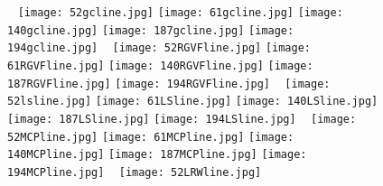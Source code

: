 \documentclass[nomlist,masters]{seuthesix}
\begin{document}
\begin{figure}[H]
\centering 
\texttt{[image: 52gcline.jpg]}
\hspace{0.001\textwidth}
\texttt{[image: 61gcline.jpg]}
\hspace{0.001\textwidth}
\texttt{[image: 140gcline.jpg]}
\hspace{0.001\textwidth}
\texttt{[image: 187gcline.jpg]}
\hspace{0.001\textwidth}
\texttt{[image: 194gcline.jpg]}
\vfill
\vspace{6pt}
\centering 
\texttt{[image: 52RGVFline.jpg]}
\hspace{0.001\textwidth}
\texttt{[image: 61RGVFline.jpg]}
\hspace{0.001\textwidth}
\texttt{[image: 140RGVFline.jpg]}
\hspace{0.001\textwidth}
\texttt{[image: 187RGVFline.jpg]}
\hspace{0.001\textwidth}
\texttt{[image: 194RGVFline.jpg]}
\vfill
\vspace{6pt}
\centering 
\texttt{[image: 52lsline.jpg]}
\hspace{0.001\textwidth}
\texttt{[image: 61LSline.jpg]}
\hspace{0.001\textwidth}
\texttt{[image: 140LSline.jpg]}
\hspace{0.001\textwidth}
\texttt{[image: 187LSline.jpg]}
\hspace{0.001\textwidth}
\texttt{[image: 194LSline.jpg]}
\vfill
\vspace{6pt}
\centering 
\texttt{[image: 52MCPline.jpg]}
\hspace{0.001\textwidth}
\texttt{[image: 61MCPline.jpg]}
\hspace{0.001\textwidth}
\texttt{[image: 140MCPline.jpg]}
\hspace{0.001\textwidth}
\texttt{[image: 187MCPline.jpg]}
\hspace{0.001\textwidth}
\texttt{[image: 194MCPline.jpg]}
\vfill
\vspace{6pt}
\centering 
\texttt{[image: 52LRWline.jpg]}
\hspace{0.001\textwidth}

\end{figure}
\end{document}
